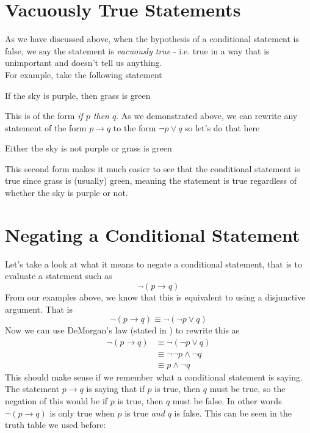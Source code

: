 \newpage

\section{Vacuously True Statements}
As we have discussed above, when the hypothesis of a conditional statement is false, we say the statement is \emph{vacuously true} - i.e. true in a way that is unimportant and doesn't tell us anything.\\

For example, take the following statement\\
\begin{center}
    If the sky is purple, then grass is green
\end{center}
This is of the form \emph{if $p$ then $q$}. As we demonstrated above, we can rewrite any statement of the form $p \to q$ to the form $\lnot p \lor q$ so let's do that here
\begin{center}
    Either the sky is not purple or grass is green
\end{center}
This second form makes it much easier to see that the conditional statement is true since grass is (usually) green, meaning the statement is true regardless of whether the sky is purple or not.

\section{Negating a Conditional Statement}
\label{sec:negatingConditional}
Let's take a look at what it means to negate a conditional statement, that is to evaluate a statement such as
$$\lnot (p \to q)$$
From our examples above, we know that this is equivalent to using a disjunctive argument. That is
$$\lnot (p \to q) \equiv \lnot (\lnot p \lor q)$$
Now we can use DeMorgan's law (stated in  ) to rewrite this as
\begin{align*}
    \lnot (p \to q) & \equiv \lnot (\lnot p \lor q)                            \\
                    & \equiv \lnot \lnot p \land \lnot q \tag*{DeMorgan's Law} \\
                    & \equiv p \land \lnot q \tag*{Double Negation}
\end{align*}
This should make sense if we remember what a conditional statement is saying. The statement $p \to q$ is saying that if $p$ is true, then $q$ must be true, so the negation of this would be if $p$ is true, then $q$ must be false. In other words $\lnot (p \to q)$ is only true when $p$ is true \emph{and} $q$ is false. This can be seen in the truth table we used before:

